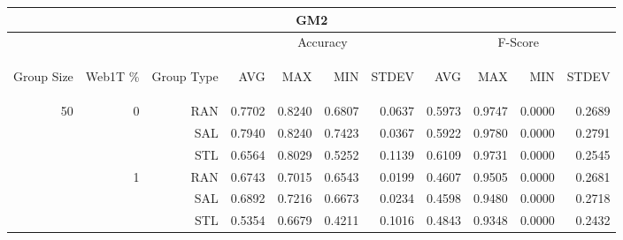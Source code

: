 \begin{center}
\begin{table}[htbp] 
 \begin{center}
\begin{tabular}{ | r | r | r | r | r | r | r | r | r | r | r |}
\hline
\multicolumn{11}{|c|}{GM2}\\
\hline
 & & & \multicolumn{4}{|c|}{Accuracy} & \multicolumn{4}{|c|}{F-Score}\\ \cline{4-11}
\begin{sideways}Group Size\end{sideways} & \begin{sideways}Web1T \%\end{sideways} & \begin{sideways}Group Type\end{sideways} & \begin{sideways}AVG\end{sideways} & \begin{sideways}MAX\end{sideways} & \begin{sideways}MIN\end{sideways} & \begin{sideways}STDEV\end{sideways} & \begin{sideways}AVG\end{sideways} & \begin{sideways}MAX\end{sideways} & \begin{sideways}MIN\end{sideways} & \begin{sideways}STDEV\end{sideways}\\
\hline
\multirow{15}{*}{50}
 & \multirow{3}{*}{0} & RAN & 0.7702 & 0.8240 & 0.6807 & 0.0637 & 0.5973 & 0.9747 & 0.0000 & 0.2689\\ \cline{3-11}
 &   & SAL & 0.7940 & 0.8240 & 0.7423 & 0.0367 & 0.5922 & 0.9780 & 0.0000 & 0.2791\\ \cline{3-11}
 &   & STL & 0.6564 & 0.8029 & 0.5252 & 0.1139 & 0.6109 & 0.9731 & 0.0000 & 0.2545\\ \cline{2-11}
 & \multirow{3}{*}{1} & RAN & 0.6743 & 0.7015 & 0.6543 & 0.0199 & 0.4607 & 0.9505 & 0.0000 & 0.2681\\ \cline{3-11}
 &   & SAL & 0.6892 & 0.7216 & 0.6673 & 0.0234 & 0.4598 & 0.9480 & 0.0000 & 0.2718\\ \cline{3-11}
 &   & STL & 0.5354 & 0.6679 & 0.4211 & 0.1016 & 0.4843 & 0.9348 & 0.0000 & 0.2432\\ \cline{2-11}

\end{tabular}
\end{center}
\end{table}
\end{center}
